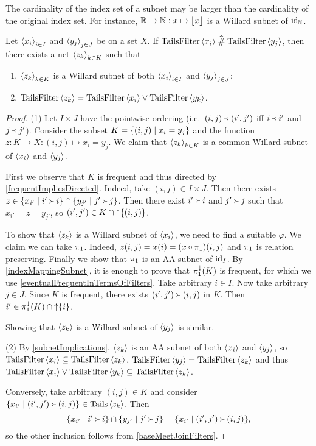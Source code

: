 \begin{example}
The cardinality of the index set of a subnet may be larger than the cardinality of the original index set. For instance, $\mathbb{R}\to \mathbb{N}: x\mapsto \lfloor x\rfloor$ is a Willard subnet of $\operatorname{id}_{\mathbb{N}}$.
\end{example}

\begin{proposition} \label{WillardSubnetMeshingNets}
Let $\left\langle x_i \right\rangle_{i\in I}$ and $\left\langle y_j \right\rangle_{j\in J}$ be on a set $X$. If $\operatorname{TailsFilter}\left\langle x_i \right\rangle \mathrel{\widehat{\#}} \operatorname{TailsFilter}\left\langle y_j \right\rangle$, then there exists a net $\left\langle z_k \right\rangle_{k\in K}$ such that
\begin{enumerate}
\item $\left\langle z_k \right\rangle_{k\in K}$ is a Willard subnet of both $\left\langle x_i \right\rangle_{i\in I}$ and $\left\langle y_j \right\rangle_{j\in J}$;
\item $\operatorname{TailsFilter}\left\langle z_k \right\rangle = \operatorname{TailsFilter}\left\langle x_i \right\rangle\vee \operatorname{TailsFilter}\left\langle y_k \right\rangle$.
\end{enumerate}
\end{proposition}
\begin{proof}
(1) Let $I\times J$ have the pointwise ordering (i.e.\ $(i,j) \Yleft (i', j')$ iff $i\Yleft i'$ and $j \Yleft j'$). Consider the subset $K = \setbuilder{(i,j)}{x_i = y_j}$ and the function $z: K\to X: (i,j) \mapsto x_i = y_j$. We claim that $\left\langle z_k \right\rangle_{k\in K}$ is a common Willard subnet of $\left\langle x_i \right\rangle$ and $\left\langle y_j \right\rangle$.

First we observe that $K$ is frequent and thus directed by \ref{frequentImpliesDirected}. Indeed, take $(i,j)\in I\times J$. Then there exists $z\in \setbuilder{x_{i'}}{i'\Yright i} \cap \setbuilder{y_{j'}}{j'\Yright j}$. Then there exist $i'\Yright i$ and $j'\Yright j$ such that $x_{i'} = z = y_{j'}$, so $(i',j')\in K \cap \operatorname{\uparrow}\{(i,j)\}$.

To show that $\left\langle z_k \right\rangle$ is a Willard subnet of $\left\langle x_i \right\rangle$, we need to find a suitable $\varphi$. We claim we can take $\pi_1$. Indeed, $z(i,j) = x(i) = (x\circ \pi_1)(i,j)$ and $\pi_1$ is relation preserving. Finally we show that $\pi_1$ is an AA subnet of $\operatorname{id}_I$. By \ref{indexMappingSubnet}, it is enough to prove that $\pi_1^{\downarrow}(K)$ is frequent, for which we use \ref{eventualFrequentInTermsOfFilters}. Take arbitrary $i\in I$. Now take arbitrary $j\in J$. Since $K$ is frequent, there exists $(i',j')\Yright (i,j)$ in $K$. Then $i'\in \pi_1^\downarrow(K)\cap \operatorname{\uparrow} \{i\}$.

Showing that $\left\langle z_k \right\rangle$ is a Willard subnet of $\left\langle y_j \right\rangle$ is similar.

(2) By \ref{subnetImplications}, $\left\langle z_k \right\rangle$ is an AA subnet of both $\left\langle x_i \right\rangle$ and $\left\langle y_j \right\rangle$, so $\operatorname{TailsFilter}\left\langle x_i \right\rangle \subseteq \operatorname{TailsFilter}\left\langle z_k \right\rangle$, $\operatorname{TailsFilter}\left\langle y_j \right\rangle = \operatorname{TailsFilter}\left\langle z_k \right\rangle$ and thus $\operatorname{TailsFilter}\left\langle x_i \right\rangle\vee \operatorname{TailsFilter}\left\langle y_k \right\rangle\subseteq \operatorname{TailsFilter}\left\langle z_k \right\rangle$.

Conversely, take arbitrary $(i,j)\in K$ and consider $\setbuilder{x_{i'}}{(i',j')\Yright (i,j)}\in \Tails\seq{z_k}$. Then
\[ \setbuilder{x_{i'}}{i'\Yright i}\cap \setbuilder{y_{j'}}{j'\Yright j} = \setbuilder{x_{i'}}{(i',j')\Yright (i,j)}, \]
so the other inclusion follows from \ref{baseMeetJoinFilters}.
\end{proof}

